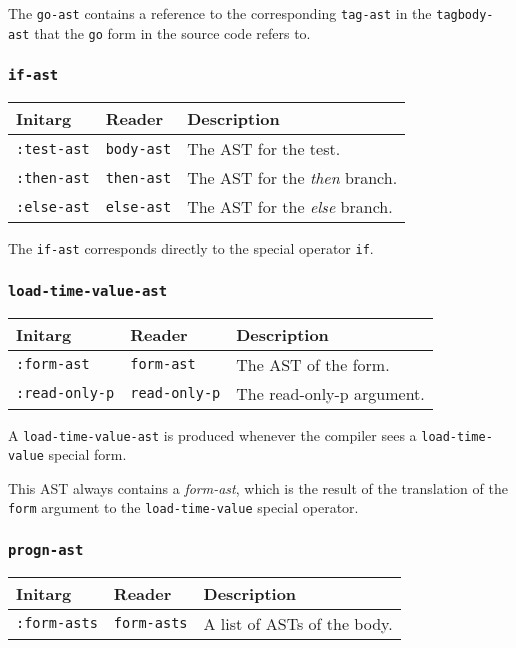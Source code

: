 The \texttt{go-ast} contains a reference to the corresponding
\texttt{tag-ast} in the \texttt{tagbody-ast} that the \texttt{go} form
in the source code refers to.

\subsubsection{\texttt{if-ast}}
\label{if-ast}

\begin{tabular}{|l|l|l|}
\hline
Initarg & Reader & Description\\
\hline\hline
\texttt{:test-ast} & \texttt{body-ast} & The AST for the test.\\
\hline
\texttt{:then-ast} & \texttt{then-ast} & The AST for the \emph{then} branch.\\
\hline
\texttt{:else-ast} & \texttt{else-ast} & The AST for the \emph{else} branch.\\
\hline
\end{tabular}

The \texttt{if-ast} corresponds directly to the \commonlisp{} special operator
\texttt{if}.

\subsubsection{\texttt{load-time-value-ast}}
\label{load-time-value-ast}

\begin{tabular}{|l|l|l|}
\hline
Initarg & Reader & Description\\
\hline\hline
\texttt{:form-ast} & \texttt{form-ast} & The AST of the form.\\
\texttt{:read-only-p} & \texttt{read-only-p} & The read-only-p argument.\\
\hline
\end{tabular}

A \texttt{load-time-value-ast} is produced whenever the compiler sees
a \texttt{load-time-value} special form.

This AST always contains a \emph{form-ast}, which is the result of the
translation of the \texttt{form} argument to the
\texttt{load-time-value} special operator.

\subsubsection{\texttt{progn-ast}}
\label{progn-ast}

\begin{tabular}{|l|l|l|}
\hline
Initarg & Reader & Description\\
\hline\hline
\texttt{:form-asts} & \texttt{form-asts} & A list of ASTs of the body.\\
\hline
\end{tabular}

